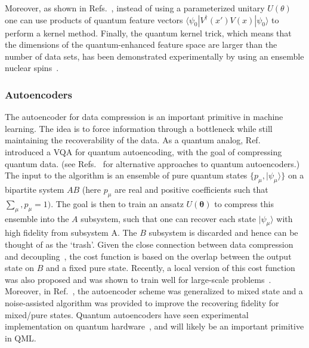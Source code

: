 \documentclass[prx,twocolumn,floatfix,superscriptaddress,longbibliography]{revtex4-1}
\renewcommand{\vec}[1]{\boldsymbol{#1}}  %
\newcommand{\<}{\langle}
\renewcommand{\>}{\rangle}
\newcommand{\ket}[1]{|#1\rangle}               %
\renewcommand{\vec}[1]{\boldsymbol{#1}}  %
\begin{document}
Moreover, as shown in Refs.~\cite{havlivcek2019supervised,schuld2019quantum}, instead of using a parameterized unitary $U(\theta)$ one can use products of quantum feature vectors $\langle \psi_0 | V^{\dag}(x') V(x) |\psi _0 \rangle $ to perform a kernel method. Finally, the quantum kernel trick, which means that the dimensions of the quantum-enhanced feature space are larger than the number of data sets, has been demonstrated experimentally by using an ensemble nuclear spins~\cite{kusumoto2019experimental}.



\subsubsection{ Autoencoders} The autoencoder for data compression is an important primitive in machine learning. The idea is to force information through a bottleneck while still maintaining the recoverability of the data. As a quantum analog, Ref.~\cite{Romero} introduced a VQA for quantum autoencoding, with the goal of compressing quantum data. (see Refs.~\cite{wan2017quantum,verdon2018universal} for alternative approaches to quantum autoencoders.) The input to the algorithm is an ensemble of pure quantum states $\{p_{\mu},\ket{\psi_{\mu}}\}$ on a bipartite system $AB$ (here $p_\mu$ are real and positive coefficients such that $\sum_\mu,p_\mu=1)$. The goal is then to train an ansatz $U(\vec{\theta})$ to compress this ensemble into the $A$ subsystem, such that one can recover each state $\ket{\psi_{\mu}}$ with high fidelity from subsystem A. The $B$ subsystem is discarded and hence can be thought of as the `trash'. Given the close connection between data compression and decoupling~\cite{Romero}, the cost function is based on the overlap between the output state on $B$ and a fixed pure state. Recently, a local version of this cost function was also proposed and was shown to train well for large-scale problems~\cite{cerezo2020cost}. Moreover, in Ref.~\cite{cao2020noise}, the autoencoder scheme was generalized to mixed state and a noise-assisted algorithm was provided to improve the recovering fidelity for mixed/pure states. Quantum autoencoders have  seen experimental implementation on quantum hardware~\cite{pepper2019experimental}, and will likely be an important primitive in QML. 
\end{document}
